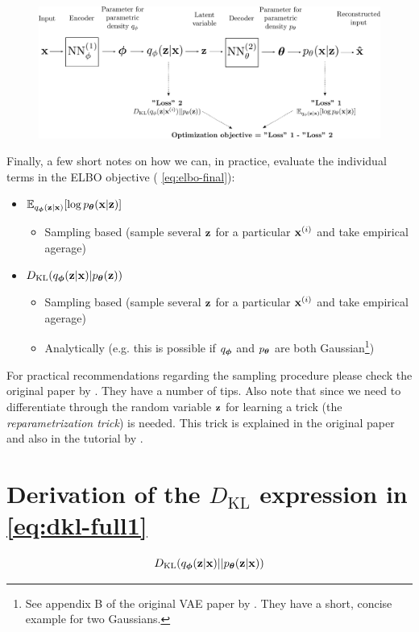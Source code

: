 \documentclass[11pt]{article}
\theoremstyle{definition}
\begin{document}
\begin{figure}[h]
	\includegraphics[width=\linewidth]{figures/vae-graph.png}
	\label{fig:vae-graph}
\end{figure}
\par 
Finally, a few short notes on how we can, in practice, evaluate the individual terms in the ELBO objective ( \autoref{eq:elbo-final}):
\begin{itemize}
	\item $\mathbb{E}_{q_{\boldsymbol{\phi}}(\mathbf{z}|\mathbf{x})}[\log p_{\boldsymbol{\theta}}(\mathbf{x}|\mathbf{z})]$
	\begin{itemize}
		\item Sampling based (sample several $\mathbf{z}$ for a particular $\mathbf{x}^{(i)}$ and take empirical agerage)
	\end{itemize}
	\item $D_{\text{KL}}(q_{\boldsymbol{\phi}}(\mathbf{z}|\mathbf{x})|p_{\boldsymbol{\theta}}(\mathbf{z}))$
	\begin{itemize}
		\item Sampling based (sample several $\mathbf{z}$ for a particular $\mathbf{x}^{(i)}$ and take empirical agerage)
		\item Analytically (e.g. this is possible if $q_{\boldsymbol{\phi}}$ and $p_{\boldsymbol{\theta}}$ are both Gaussian\footnote{See appendix B of the original VAE paper by \citep{kingma_auto-encoding_2013}. They have a short, concise example for two Gaussians.})
	\end{itemize}
\end{itemize}
For practical recommendations regarding the sampling procedure please check the original paper by \citep{kingma_auto-encoding_2013}. They have a number of tips. Also note that since we need to differentiate through the random variable $\mathbf{z}$ for learning a trick (the \textit{reparametrization trick}) is needed. This trick is explained in the original paper and also in the tutorial by \citep{altosaar_tutorial_2017}.

\printbibliography

\appendix
	\section{Derivation of the $D_{\text{KL}}$ expression in \autoref{eq:dkl-full1}}
	\label{appendix:dkl-derivation}
	\begin{equation}
		D_{\text{KL}}(q_{\boldsymbol{\phi}}(\mathbf{z}|\mathbf{x})||p_{\boldsymbol{\theta}}(\mathbf{z}|\mathbf{x}))
	\end{equation}
	
\end{document}
